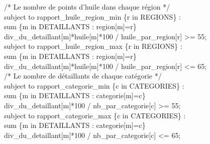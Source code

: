 \documentclass[a4paper,12pt,oneside]{report}
\begin{document}
/* Le nombre de points d'huile dans chaque région */\\
subject to rapport\_huile\_region\_min \{r in REGIONS\} :\\
	sum \{m in DETAILLANTS : region[m]=r\}\\
	div\_du\_detaillant[m]*huile[m]*100 / huile\_par\_region[r] >= 55;\\

subject to rapport\_huile\_region\_max \{r in REGIONS\} :\\
	sum \{m in DETAILLANTS : region[m]=r\}\\
	div\_du\_detaillant[m]*huile[m]*100 / huile\_par\_region[r] <= 65;\\

/* Le nombre de détaillants de chaque catégorie */\\
subject to rapport\_categorie\_min \{c in CATEGORIES\} :\\
	sum \{m in DETAILLANTS : categorie[m]=c\}\\
	div\_du\_detaillant[m]*100 / nb\_par\_categorie[c] >= 55;\\

subject to rapport\_categorie\_max \{c in CATEGORIES\} :\\
	sum \{m in DETAILLANTS : categorie[m]=c\}\\
	div\_du\_detaillant[m]*100 / nb\_par\_categorie[c] <= 65;\\
\end{document}

